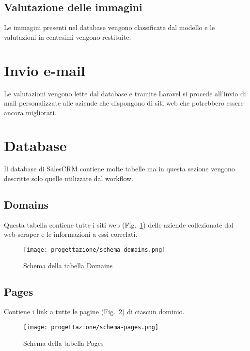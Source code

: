\subsection{Valutazione delle immagini}
Le immagini presenti nel database vengono classificate dal modello e le valutazioni in centesimi vengono restituite.

\section{Invio e-mail}
Le valutazioni vengono lette dal database e tramite Laravel si procede all'invio di mail personalizzate alle aziende che dispongono di siti web che potrebbero essere ancora migliorati.

\section{Database}
Il database di SalesCRM contiene molte tabelle ma in questa sezione vengono descritte solo quelle utilizzate dal workflow.

\subsection{Domains}
Questa tabella contiene tutte i siti web (Fig.~\ref{fig:schema-domains}) delle aziende collezionate dal web-scraper e le informazioni a essi correlati.


\begin{figure}[!h] 
  \centering 
  \texttt{[image: progettazione/schema-domains.png]} 
  \caption{Schema della tabella Domains}
  \label{fig:schema-domains}
\end{figure}


\subsection{Pages}
Contiene i link a tutte le pagine (Fig.~\ref{fig:schema-pages}) di ciascun dominio.

\begin{figure}[!h] 
  \centering 
  \texttt{[image: progettazione/schema-pages.png]} 
  \caption{Schema della tabella Pages}
  \label{fig:schema-pages}
\end{figure}
